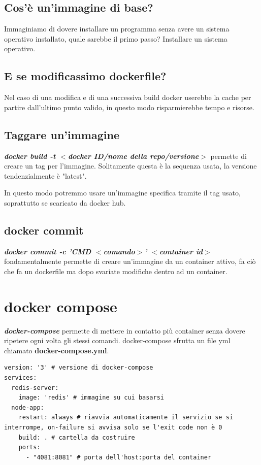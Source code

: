 \documentclass[11pt,a4paper]{book}
\begin{document}
\section{Cos'è un'immagine di base?}
Immaginiamo di dovere installare un programma senza avere un sistema operativo installato, quale sarebbe il primo passo? Installare un sistema operativo.

\section{E se modificassimo dockerfile?}
Nel caso di una modifica e di una successiva build docker userebbe la cache per partire dall'ultimo punto valido, in questo modo risparmierebbe tempo e risorse.

\section{Taggare un'immagine}
\emph{\textbf{docker build -t $<$docker ID/nome della repo/versione$>$}} permette di creare un tag per l'immagine. Solitamente questa è la sequenza usata, la versione tendenzialmente è "latest".

In questo modo potremmo usare un'immagine specifica tramite il tag usato, soprattutto se scaricato da docker hub.

\section{docker commit}
\emph{\textbf{docker commit -c 'CMD $<$comando$>$' $<$container id$>$}} fondamentalmente permette di creare un'immagine da un container attivo, fa ciò che fa un dockerfile ma dopo svariate modifiche dentro ad un container.

\chapter{docker compose}
\emph{\textbf{docker-compose}} permette di mettere in contatto più container senza dovere ripetere ogni volta gli stessi comandi. docker-compose sfrutta un file yml chiamato \textbf{docker-compose.yml}. 
\begin{lstlisting}
version: '3' # versione di docker-compose
services:
  redis-server:
    image: 'redis' # immagine su cui basarsi
  node-app:
    restart: always # riavvia automaticamente il servizio se si interrompe, on-failure si avvisa solo se l'exit code non è 0
    build: . # cartella da costruire
    ports:
      - "4081:8081" # porta dell'host:porta del container
\end{lstlisting}
\end{document}
